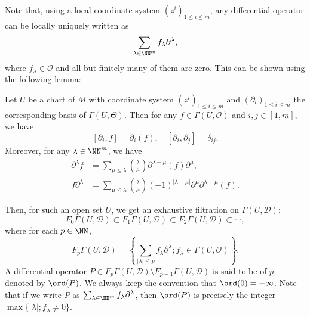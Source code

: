 Note that, using a local coordinate system $(z^i)_{1\le i\le m}$, 
any differential operator can be locally uniquely written as
\[
\sum_{\lambda\in\NN^m}f_\lambda\partial^\lambda,
\]
where $f_\lambda\in\mathscr{O}$ and all but finitely many of them are zero. 
This can be shown using the following lemma:
\begin{lem}
Let $U$ be a chart of $M$ with coordinate system $(z^i)_{1\le i\le m}$ and 
$(\partial_i)_{1\le i\le m}$ the corresponding basis of $\Gamma(U,\Theta)$. 
Then for any $f\in\Gamma(U,\mathscr{O})$ and $i,j\in[1,m]$, we have
\[
[\partial_i,f]=\partial_i(f),\quad
[\partial_i,\partial_j]=\delta_{ij}.
\]
Moreover, for any $\lambda\in\NN^m$, we have
\begin{align*}
\partial^\lambda f&=
\sum_{\mu\le\lambda}\binom{\lambda}{\mu}
\partial^{\lambda-\mu}(f)\partial^\mu,\\
f\partial^\lambda&=
\sum_{\mu\le\lambda}\binom{\lambda}{\mu}(-1)^{|\lambda-\mu|}
\partial^\mu\partial^{\lambda-\mu}(f).
\end{align*}
\end{lem}

Then, for such an open set $U$, we get an exhaustive filtration on $\Gamma(U,\mathscr{D})$:
\[
F_0\Gamma(U,\mathscr{D})\subset F_1\Gamma(U,\mathscr{D})
\subset F_2\Gamma(U,\mathscr{D})\subset\cdots,
\]
where for each $p\in\NN$, 
\[
F_p\Gamma(U,\mathscr{D})=
\left\{\sum_{|\lambda|\le p}f_\lambda\partial^\lambda;
f_\lambda\in\Gamma(U,\mathscr{O})\right\}.
\]
A differential operator 
$P\in F_p\Gamma(U,\mathscr{D})\setminus F_{p-1}\Gamma(U,\mathscr{D})$ 
is said to be of  $p$, denoted by $\ord(P)$. 
We always keep the convention that $\ord(0)=-\infty$.
Note that if we write $P$ as 
$\sum_{\lambda\in\NN^m}f_\lambda\partial^\lambda$, 
then $\ord(P)$ is precisely the integer $\max\{|\lambda|;f_\lambda\neq0\}$. 

